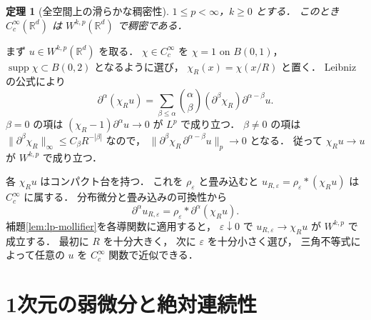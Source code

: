 \documentclass[a5paper,10pt,onecolumn]{jsarticle}
\makeatletter
\theoremstyle{mathnotetheorem}
\newtheorem{theorem}{定理}[section]
\renewcommand{\proofname}{証明}
\renewenvironment{proof}[1][\proofname]{%
  \par\pushQED{\qed}\normalfont\topsep4\p@\@plus2\p@\relax
  \trivlist\item[\hskip\labelsep\bfseries #1]\ignorespaces
}{\popQED\endtrivlist\@endpefalse}
\newcommand{\norm}[1]{\lVert #1\rVert}
\makeatother
\begin{document}
\begin{theorem}[全空間上の滑らかな稠密性]\label{thm:smooth-dense}
$1\le p<\infty$，$k\ge0$ とする．
このとき $C_c^\infty(\mathbb R^d)$ は
$W^{k,p}(\mathbb R^d)$ で稠密である．
\end{theorem}
\begin{proof}
まず $u\in W^{k,p}(\mathbb R^d)$ を取る．
$\chi\in C_c^\infty$ を
$\chi=1$ on $B(0,1)$，
$\operatorname{supp}\chi\subset B(0,2)$ となるように選び，
$\chi_R(x)=\chi(x/R)$ と置く．
Leibnizの公式により
\[
 \partial^\alpha(\chi_Ru)
 =\sum_{\beta\le\alpha}{\alpha\choose\beta}
   (\partial^\beta\chi_R)\partial^{\alpha-\beta}u.
\]
$\beta=0$ の項は
$(\chi_R-1)\partial^\alpha u\to0$ が $L^p$ で成り立つ．
$\beta\ne0$ の項は
$\norm{\partial^\beta\chi_R}_\infty
 \le C_\beta R^{-|\beta|}$ なので，
$\norm{\partial^\beta\chi_R\,
       \partial^{\alpha-\beta}u}_p\to0$ となる．
従って $\chi_Ru\to u$ が $W^{k,p}$ で成り立つ．

各 $\chi_Ru$ はコンパクト台を持つ．
これを $\rho_\varepsilon$ と畳み込むと
$u_{R,\varepsilon}=\rho_\varepsilon*(\chi_Ru)$ は
$C_c^\infty$ に属する．
分布微分と畳み込みの可換性から
\[
 \partial^\alpha u_{R,\varepsilon}
 =\rho_\varepsilon*\partial^\alpha(\chi_Ru).
\]
補題\ref{lem:lp-mollifier}を各導関数に適用すると，
$\varepsilon\downarrow0$ で
$u_{R,\varepsilon}\to\chi_Ru$ が
$W^{k,p}$ で成立する．
最初に $R$ を十分大きく，
次に $\varepsilon$ を十分小さく選び，
三角不等式によって任意の $u$ を
$C_c^\infty$ 関数で近似できる．
\end{proof}

\section{1次元の弱微分と絶対連続性}
\end{document}
